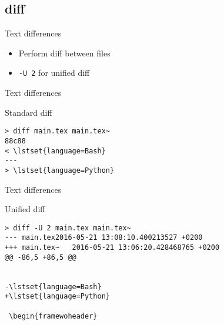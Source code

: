 \subsection{diff}

\begin{frame}[fragile]{Text differences}
  \begin{itemize}
    \pause \item Perform diff between files
    \pause \item \texttt{-U 2} for unified diff
  \end{itemize}
\end{frame}

\begin{frame}[fragile]{Text differences}
  \begin{exampleblock}{Standard diff}
    \begin{lstlisting}[showstringspaces=false,basicstyle=\tiny]
> diff main.tex main.tex~
88c88
< \lstset{language=Bash}
---
> \lstset{language=Python}
    \end{lstlisting}
  \end{exampleblock}
\end{frame}

\begin{frame}[fragile]{Text differences}
  \begin{exampleblock}{Unified diff}
    \begin{lstlisting}[showstringspaces=false,basicstyle=\tiny]
> diff -U 2 main.tex main.tex~
--- main.tex2016-05-21 13:08:10.400213527 +0200
+++ main.tex~   2016-05-21 13:06:20.428468765 +0200
@@ -86,5 +86,5 @@
 
 
-\lstset{language=Bash}
+\lstset{language=Python}
 
 \begin{framewoheader}
    \end{lstlisting}
  \end{exampleblock}
\end{frame}
